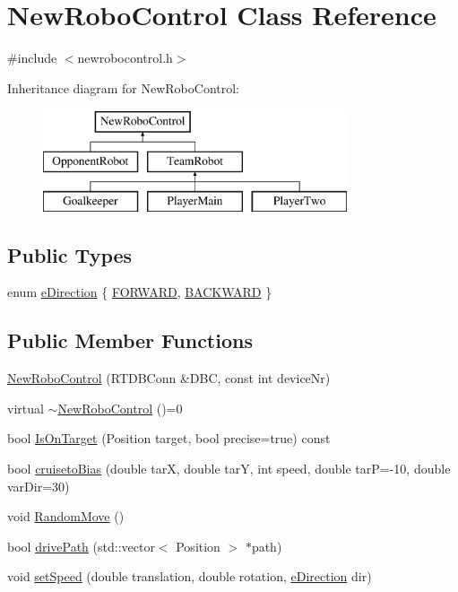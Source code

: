 \hypertarget{classNewRoboControl}{
\section{NewRoboControl Class Reference}
\label{classNewRoboControl}
}


{\ttfamily \#include $<$newrobocontrol.h$>$}

Inheritance diagram for NewRoboControl:\begin{figure}[H]
\begin{center}
\leavevmode
\includegraphics[height=3cm]{classNewRoboControl}
\end{center}
\end{figure}
\subsection*{Public Types}
\begin{DoxyCompactItemize}
\item 
enum \hyperlink{classNewRoboControl_a077fa253b827c190e82c1ce1e4c8d18f}{eDirection} \{ \hyperlink{classNewRoboControl_a077fa253b827c190e82c1ce1e4c8d18fac7af9b70b7504bd260f486172de934d9}{FORWARD}, 
\hyperlink{classNewRoboControl_a077fa253b827c190e82c1ce1e4c8d18faa55a679c9e8fbc7400c88ce3cab09c48}{BACKWARD}
 \}
\end{DoxyCompactItemize}
\subsection*{Public Member Functions}
\begin{DoxyCompactItemize}
\item 
\hyperlink{classNewRoboControl_a81f7ad52f88ea8fb90eeff5650efa1c5}{NewRoboControl} (RTDBConn \&DBC, const int deviceNr)
\item 
virtual \hyperlink{classNewRoboControl_ae63cbd6c60d37882d176e9e7d60b11ba}{$\sim$NewRoboControl} ()=0
\item 
bool \hyperlink{classNewRoboControl_a77b0e86bef15f3b1fb6cf98d91c6a9b4}{IsOnTarget} (Position target, bool precise=true) const 
\item 
bool \hyperlink{classNewRoboControl_a89119d6af9d59b6e0279b39e23c35122}{cruisetoBias} (double tarX, double tarY, int speed, double tarP=-\/10, double varDir=30)
\item 
void \hyperlink{classNewRoboControl_ab3231acd7efd60677b4f48b094cb6dd3}{RandomMove} ()
\item 
bool \hyperlink{classNewRoboControl_a9816eae1b7c90dbb74a7e0365e2b57e9}{drivePath} (std::vector$<$ Position $>$ $\ast$path)
\item 
void \hyperlink{classNewRoboControl_ad2ddddb5f0272a733021524ebaaaeffd}{setSpeed} (double translation, double rotation, \hyperlink{classNewRoboControl_a077fa253b827c190e82c1ce1e4c8d18f}{eDirection} dir)
\end{DoxyCompactItemize}
